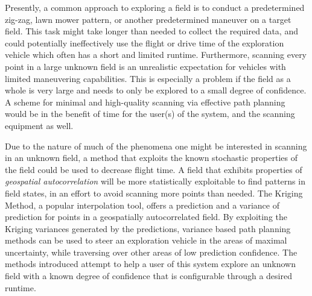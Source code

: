 Presently, a common approach to exploring a field is to conduct a predetermined zig-zag, lawn mower pattern, or another predetermined maneuver on a target field. This task might take longer than needed to collect the required data, and could potentially ineffectively use the flight or drive time of the exploration vehicle which often has a short and limited runtime. Furthermore, scanning every point in a large unknown field is an unrealistic expectation for vehicles with limited maneuvering capabilities. This is especially a problem if the field as a whole is very large and needs to only be explored to a small degree of confidence. A scheme for minimal and high-quality scanning via effective path planning would be in the benefit of time for the user(s) of the system, and the scanning equipment as well.

Due to the nature of much of the phenomena one might be interested in scanning in an unknown field, a method that exploits the known stochastic properties of the field could be used to decrease flight time. A field that exhibits properties of \textit{geospatial autocorrelation} will be more statistically exploitable to find patterns in field states, in an effort to avoid scanning more points than needed. The Kriging Method, a popular interpolation tool, offers a prediction and a variance of prediction for points in a geospatially autocorrelated field. By exploiting the Kriging variances generated by the predictions, variance based path planning methods can be used to steer an exploration vehicle in the areas of maximal uncertainty, while traversing over other areas of low prediction confidence. The methods introduced attempt to help a user of this system explore an unknown field with a known degree of confidence that is configurable through a desired runtime.

